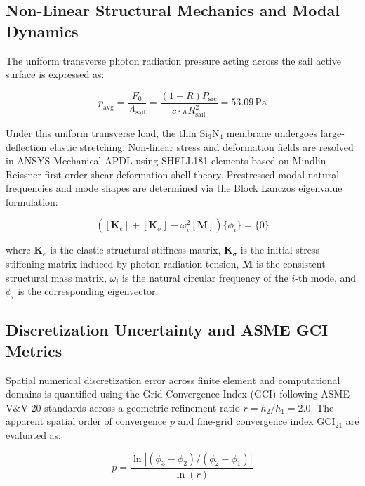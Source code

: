 \documentclass[aps,prd,reprint,superscriptaddress,nofootinbib,floatfix]{revtex4-2}
\begin{document}
\subsection{Non-Linear Structural Mechanics and Modal Dynamics}
The uniform transverse photon radiation pressure acting across the sail active surface is expressed as:

\begin{equation}
p_{\mathrm{avg}} = \frac{F_0}{A_{\mathrm{sail}}} = \frac{(1+R) P_{\mathrm{src}}}{c \cdot \pi R_{\mathrm{sail}}^2} = 53.09\,\mathrm{Pa}
\label{eq:pressure}
\end{equation}

Under this uniform transverse load, the thin $\mathrm{Si}_3\mathrm{N}_4$ membrane undergoes large-deflection elastic stretching. Non-linear stress and deformation fields are resolved in ANSYS Mechanical APDL using SHELL181 elements based on Mindlin-Reissner first-order shear deformation shell theory. Prestressed modal natural frequencies and mode shapes are determined via the Block Lanczos eigenvalue formulation:

\begin{equation}
\left( [\mathbf{K}_e] + [\mathbf{K}_\sigma] - \omega_i^2 [\mathbf{M}] \right) \{\phi_i\} = \{0\}
\label{eq:modal}
\end{equation}

where $\mathbf{K}_e$ is the elastic structural stiffness matrix, $\mathbf{K}_\sigma$ is the initial stress-stiffening matrix induced by photon radiation tension, $\mathbf{M}$ is the consistent structural mass matrix, $\omega_i$ is the natural circular frequency of the $i$-th mode, and $\phi_i$ is the corresponding eigenvector.

\subsection{Discretization Uncertainty and ASME GCI Metrics}
Spatial numerical discretization error across finite element and computational domains is quantified using the Grid Convergence Index (GCI) following ASME V\&V 20 standards across a geometric refinement ratio $r=h_2/h_1=2.0$. The apparent spatial order of convergence $p$ and fine-grid convergence index $\mathrm{GCI}_{21}$ are evaluated as:

\begin{equation}
p = \frac{\ln |(\phi_3 - \phi_2)/(\phi_2 - \phi_1)|}{\ln(r)}
\label{eq:orderp}
\end{equation}
\end{document}
